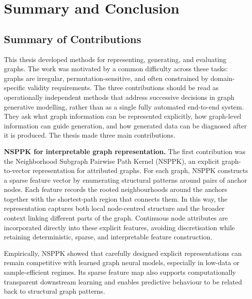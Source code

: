 \chapter{Summary and Conclusion}
\label{ch:conclusion}

\section{Summary of Contributions}
\label{sec:conclusion:summary}

This thesis developed methods for representing, generating, and evaluating
graphs. The work was motivated by a common difficulty across these tasks:
graphs are irregular, permutation-sensitive, and often constrained by
domain-specific validity requirements. The three contributions should be read
as operationally independent methods that address successive decisions in graph
generative modelling, rather than as a single fully automated end-to-end
system. They ask what graph information can be represented explicitly, how
graph-level information can guide generation, and how generated data can be
diagnosed after it is produced. The thesis made three main contributions.

\textbf{NSPPK for interpretable graph representation.}
The first contribution was the Neighborhood Subgraph Pairwise Path Kernel
(NSPPK), an explicit graph-to-vector representation for attributed graphs. For
each graph, NSPPK constructs a sparse feature vector by enumerating structural
patterns around pairs of anchor nodes. Each feature records the rooted
neighbourhoods around the anchors together with the shortest-path region that
connects them. In this way, the representation captures both local node-centred
structure and the broader context linking different parts of the graph.
Continuous node attributes are incorporated directly into these explicit
features, avoiding discretisation while retaining deterministic, sparse, and
interpretable feature construction.

Empirically, NSPPK showed that carefully designed explicit representations can
remain competitive with learned graph neural models, especially in low-data or
sample-efficient regimes. Its sparse feature map also supports computationally
transparent downstream learning and enables predictive behaviour to be related
back to structural graph patterns.

